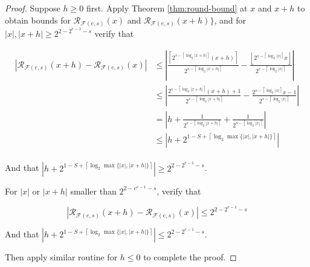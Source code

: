 \documentclass{book}
\theoremstyle{definition}\newtheorem{mechanism}{Mechanism}
\theoremstyle{remark}\newtheorem*{remark}{Remark}
\begin{document}
\begin{proof}
	Suppose $h \ge 0$ first. Apply Theorem \ref{thm:round-bound} at $x$ and $x + h$ to obtain bounds for $\mathcal{R}_{\mathcal{F}(e, s)}(x)$ and $\mathcal{R}_{\mathcal F(e, s)}(x + h)\}$, and for $|x|, |x + h| \ge 2^{2 - 2^{e - 1} - s}$ verify that
	
	\begin{align*}
		\left| \mathcal R_{\mathcal F(e, s)} (x + h) - \mathcal R_{\mathcal F(e, s)} (x) \right| 
		& \le \left|  \frac{\left\lceil 2 ^{s - \left\lceil \log_2 |x + h| \right\rceil}(x + h)\right\rceil}{2 ^{s - \left\lceil \log_2 |x + h| \right\rceil}} - \frac{\left\lfloor 2 ^{s - \left\lceil \log_2 |x| \right\rceil}x\right\rfloor}{2 ^{s - \left\lceil \log_2 |x| \right\rceil}}  \right| \\
		& \le \left|  \frac{2 ^{s - \left\lceil \log_2 |x + h| \right\rceil}(x + h) + 1}{2 ^{s - \left\lceil \log_2 |x + h| \right\rceil}} - \frac{2^{s - \left\lceil \log_2 |x| \right\rceil}x - 1}{2 ^{s - \left\lceil \log_2 |x| \right\rceil}}  \right| \\
		& =  \left| h + \frac{1}{2 ^{s - \left\lceil \log_2 |x + h| \right\rceil}} + \frac{1}{2 ^{s - \left\lceil \log_2 |x| \right\rceil}}  \right| \\
		& \le \left|h + 2^{1 - S + \left\lceil \log_2 \max\{|x|, |x + h|\} \right\rceil}\right|
	\end{align*}\\
	
	And that $\left|h + 2^{1 - S + \left\lceil \log_2 \max\{|x|, |x + h|\} \right\rceil}\right| \ge 2^{2 -2^{e - 1} - s}$.
	
	For $|x|$ or $|x + h|$ smaller than $2^{2 - e^{e - 1} - s}$, verify that
	
	\begin{equation*}
		\left| \mathcal R_{\mathcal F(e, s)} (x + h) - \mathcal R_{\mathcal F(e, s)} (x) \right| \le 2^{2 -2^{e - 1} - s}
	\end{equation*}
	
	And that $\left|h + 2^{1 - S + \left\lceil \log_2 \max\{|x|, |x + h|\} \right\rceil}\right| \le 2^{2 -2^{e - 1} - s}$.
	
	Then apply similar routine for $h\le 0$ to complete the proof.
\end{proof}
\end{document}
